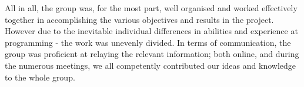 All in all, the group was, for the most part, well organised and worked effectively together in accomplishing the various objectives and results in the project. However due to the inevitable individual differences in abilities and  experience at programming - the work was unevenly divided. In terms of communication, the group was proficient at relaying the relevant information; both online, and during the numerous meetings, we all competently contributed our ideas and knowledge to the whole group.